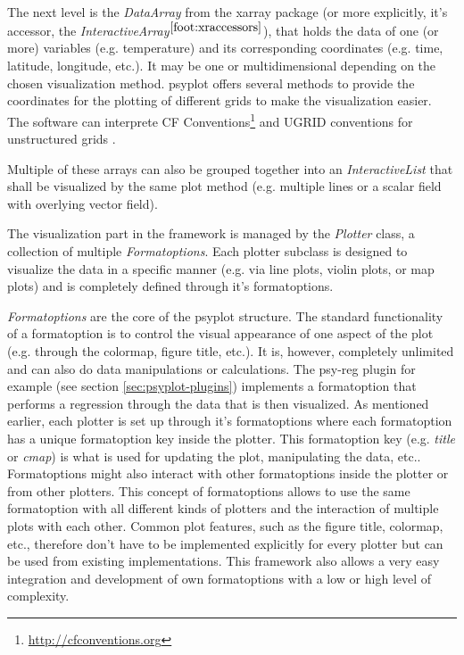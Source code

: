\begin{refsection}
The next level is the \textit{DataArray} from the xarray package (or more explicitly, it's accessor, the \textit{InteractiveArray}$^{\ref{foot:xraccessors}}$), that holds the data of one (or more) variables (e.g. temperature) and its corresponding coordinates (e.g. time, latitude, longitude, etc.). It may be one or multidimensional depending on the chosen visualization method. psyplot offers several methods to provide the coordinates for the plotting of different grids to make the visualization easier. The software can interprete CF Conventions\footnote{\url{http://cfconventions.org}} and UGRID conventions for unstructured grids \citep{JagersStuebeGrossEtAl2018}.

Multiple of these arrays can also be grouped together into an \textit{InteractiveList} that shall be visualized by the same plot method (e.g. multiple lines or a scalar field with overlying vector field).

The visualization part in the framework is managed by the \textit{Plotter} class, a collection of multiple \textit{Formatoptions}. Each plotter subclass is designed to visualize the data in a specific manner (e.g. via line plots, violin plots, or map plots) and is completely defined through it’s formatoptions.

\textit{Formatoptions} are the core of the psyplot structure. The standard functionality of a formatoption is to control the visual appearance of one aspect of the plot (e.g. through the colormap, figure title, etc.). It is, however, completely unlimited and can also do data manipulations or calculations. The psy-reg plugin for example (see section \ref{sec:psyplot-plugins}) implements a formatoption that performs a regression through the data that is then visualized. As mentioned earlier, each plotter is set up through it’s formatoptions where each formatoption has a unique formatoption key inside the plotter. This formatoption key (e.g. \textit{title} or \textit{cmap}) is what is used for updating the plot, manipulating the data, etc.. Formatoptions might also interact with other formatoptions inside the plotter or from other plotters. This concept of formatoptions allows to use the same formatoption with all different kinds of plotters and the interaction of multiple plots with each other. Common plot features, such as the figure title, colormap, etc., therefore don't have to be implemented explicitly for every plotter but can be used from existing implementations. This framework also allows a very easy integration and development of own formatoptions with a low or high level of complexity.


\end{refsection}
